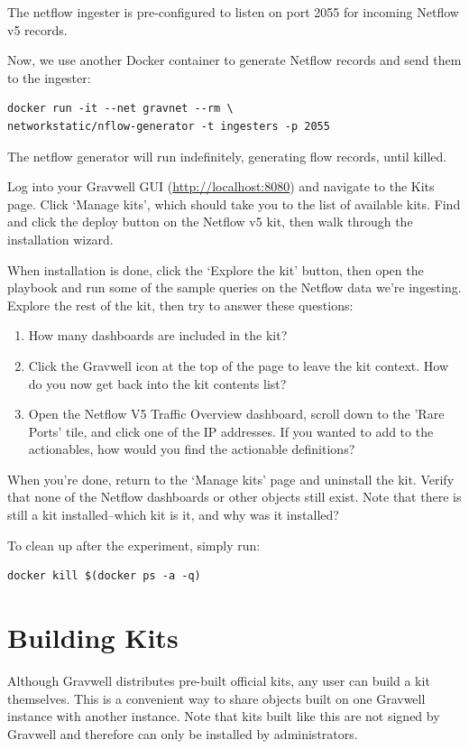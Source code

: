 The netflow ingester is pre-configured to listen on port 2055 for
incoming Netflow v5 records.

Now, we use another Docker container to generate Netflow records and
send them to the ingester:

\begin{Verbatim}[breaklines=true]
docker run -it --net gravnet --rm \
networkstatic/nflow-generator -t ingesters -p 2055
\end{Verbatim}

The netflow generator will run indefinitely, generating flow records,
until killed.

Log into your Gravwell GUI (\href{http://localhost:8080}{http://localhost:8080}) and navigate to the Kits page. Click `Manage kits', which should take you to the list of available kits. Find and click the deploy button on the Netflow v5 kit, then walk through the installation wizard.

When installation is done, click the `Explore the kit' button, then open the playbook and run some of the sample queries on the Netflow data we're ingesting. Explore the rest of the kit, then try to answer these questions:

\begin{enumerate}
\item
	How many dashboards are included in the kit?
\item
	Click the Gravwell icon at the top of the page to leave the kit context. How do you now get back into the kit contents list?
\item
	Open the Netflow V5 Traffic Overview dashboard, scroll down to the 'Rare Ports' tile, and click one of the IP addresses. If you wanted to add to the actionables, how would you find the actionable definitions?
\end{enumerate}

When you're done, return to the `Manage kits' page and uninstall the kit. Verify that none of the Netflow dashboards or other objects still exist. Note that there is still a kit installed--which kit is it, and why was it installed?

To clean up after the experiment, simply run:

\begin{Verbatim}[breaklines=true]
docker kill $(docker ps -a -q)
\end{Verbatim}

\section{Building Kits}
Although Gravwell distributes pre-built official kits, any user can build a kit themselves. This is a convenient way to share objects built on one Gravwell instance with another instance. Note that kits built like this are not signed by Gravwell and therefore can only be installed by administrators.

